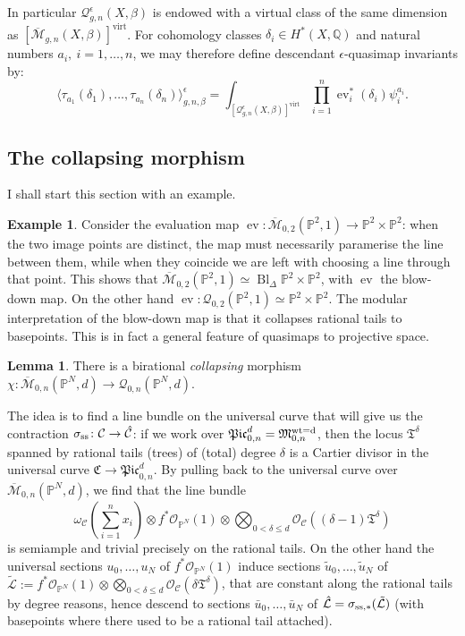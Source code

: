 \documentclass[11pt]{amsart}
\newcommand{\M}[4]{\overline{\mathcal{M}}_{#1,#2}(#3,#4)}
\newcommand{\Q}[4]{\mathcal{Q}_{#1,#2}(#3,#4)}
\newcommand{\Qe}[4]{\mathcal{Q}^{\epsilon}_{#1,#2}(#3,#4)}
\newcommand{\PP}{\mathbb P}
\newcommand{\QQ}{\mathbb{Q}}
\newcommand{\OO}{\mathcal{O}}
\renewcommand{\to}{\rightarrow}
\newcommand{\MM}{\mathfrak M}
\newcommand{\virt}[1]{[#1]^{\operatorname{virt}}}
\newcommand{\ev}{\operatorname{ev}}
\newcommand{\Bl}{\operatorname{Bl}}
\theoremstyle{definition}
\newtheorem{lem}[thm]{Lemma}
\theoremstyle{definition}
\newtheorem{ex}[thm]{Example}
\newcommand{\ilemph}[1]{\emph{#1}}
\begin{document}
In particular $\Qe{g}{n}{X}{\beta}$ is endowed with a virtual class of the same dimension as $\virt{\M{g}{n}{X}{\beta}}$. For cohomology classes $\delta_i\in H^*(X,\QQ)$ and natural numbers $a_i,\ i=1,\ldots,n$, we may therefore define descendant $\epsilon$-quasimap invariants by:
\[\langle \tau_{a_1}(\delta_1),\ldots,\tau_{a_n}(\delta_n)\rangle^\epsilon_{g,n,\beta}=\int_{\virt{\Qe{g}{n}{X}{\beta}}}\prod_{i=1}^n \ev_i^*(\delta_i)\psi_i^{a_i}.\]

\subsection{The collapsing morphism} I shall start this section with an example.
\begin{ex}\label{ex:lines_in_p2}
 Consider the evaluation map $\ev\colon \M{0}{2}{\PP^2}{1}\to \PP^2\times\PP^2$: when the two image points are distinct, the map must necessarily paramerise the line between them, while when they coincide we are left with choosing a line through that point. This shows that $\M{0}{2}{\PP^2}{1}\simeq \Bl_{\Delta}\PP^2\times\PP^2$, with $\ev$ the blow-down map. On the other hand $\ev\colon \Q{0}{2}{\PP^2}{1}\simeq \PP^2\times\PP^2$. The modular interpretation of the blow-down map is that it collapses rational tails to basepoints. This is in fact a general feature of quasimaps to projective space.
\end{ex}

\begin{lem}
 There is a birational \ilemph{collapsing} morphism $\chi\colon \M{0}{n}{\PP^N}{d}\to \Q{0}{n}{\PP^N}{d}$.
\end{lem}

The idea is to find a line bundle on the universal curve that will give us the contraction $\sigma_{\rm{ss}}\colon\mathcal C\to\hat{\mathcal C}$: if we work over $\mathfrak{Pic}^d_{0,n}=\MM_{0,n}^{\rm{wt}=d}$, then the locus $\mathfrak T^\delta$ spanned by rational tails (trees) of (total) degree $\delta$ is a Cartier divisor in the universal curve $\mathfrak C\to\mathfrak{Pic}^d_{0,n}$. By pulling back to the universal curve over $\M{0}{n}{\PP^N}{d}$, we find that the line bundle \[\omega_\mathcal C\left(\sum_{i=1}^n x_i\right)\otimes f^*\OO_{\PP^N}(1)\otimes \bigotimes_{0<\delta\leq d}\OO_\mathcal C\left((\delta-1)\mathfrak T^\delta\right) \] is semiample and trivial precisely on the rational tails. On the other hand the universal sections $u_0,\ldots,u_N$ of $f^*\OO_{\PP^N}(1)$ induce sections $\tilde{u}_0,\ldots,\tilde{u}_N$ of $\tilde{\mathcal L}:=f^*\OO_{\PP^N}(1)\otimes \bigotimes_{0<\delta\leq d}\OO_\mathcal C\left(\delta\mathfrak T^\delta\right)$, that are constant along the rational tails by degree reasons, hence descend to sections $\bar{u}_0,\ldots,\bar{u}_N$ of $\hat{\mathcal L}=\sigma_{\rm{ss},*}(\tilde{\mathcal L})$ (with basepoints where there used to be a rational tail attached).
\end{document}
